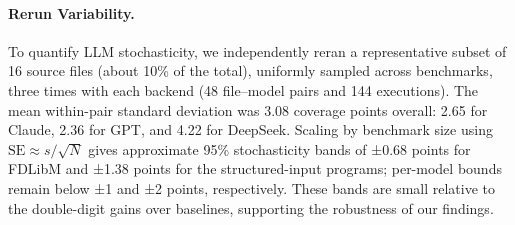 \documentclass[acmsmall]{acmart}
\newenvironment{revblock}{\color{red}}{}
\newenvironment{revblock}{}{}
\theoremstyle{definition}
\begin{document}
\begin{revblock}
\paragraph*{Rerun Variability.} To quantify LLM stochasticity, we independently reran a representative subset of 16 source files (about 10\% of the total), uniformly sampled across benchmarks, three times with each backend (48 file--model pairs and 144 executions). The mean within-pair standard deviation was 3.08 coverage points overall: 2.65 for Claude, 2.36 for GPT, and 4.22 for DeepSeek. Scaling by benchmark size using $\mathrm{SE} \approx s / \sqrt{N}$ gives approximate 95\% stochasticity bands of ±0.68 points for FDLibM and ±1.38 points for the structured-input programs; per-model bounds remain below ±1 and ±2 points, respectively. These bands are small relative to the double-digit gains over baselines, supporting the robustness of our findings.
\end{revblock}
    





\end{document}
